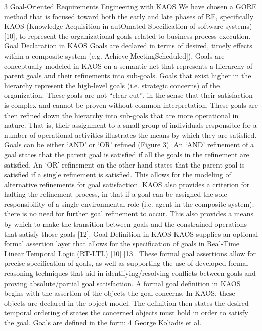 3 Goal-Oriented Requirements Engineering with KAOS
We have chosen a GORE method that is focused toward both the early and late
phases of RE, specifically KAOS (Knowledge Acquisition in autOmated Specification of software systems) [10], to represent the organizational goals related to
business process execution.
Goal Declaration in KAOS Goals are declared in terms of desired, timely
effects within a composite system (e.g. Achieve[MeetingScheduled]). Goals are
conceptually modeled in KAOS on a semantic net that represents a hierarchy
of parent goals and their refinements into sub-goals. Goals that exist higher
in the hierarchy represent the high-level goals (i.e. strategic concerns) of the
organization. These goals are not “clear cut”, in the sense that their satisfaction
is complex and cannot be proven without common interpretation. These goals
are then refined down the hierarchy into sub-goals that are more operational
in nature. That is, their assignment to a small group of individuals responsible
for a number of operational activities illustrates the means by which they are
satisfied.
Goals can be either ‘AND’ or ‘OR’ refined (Figure 3). An ‘AND’ refinement
of a goal states that the parent goal is satisfied if all the goals in the refinement
are satisfied. An ‘OR’ refinement on the other hand states that the parent goal
is satisfied if a single refinement is satisfied. This allows for the modeling of alternative refinements for goal satisfaction. KAOS also provides a criterion for
halting the refinement process, in that if a goal can be assigned the sole responsibility of a single environmental role (i.e. agent in the composite system); there
is no need for further goal refinement to occur. This also provides a means by
which to make the transition between goals and the constrained operations that
satisfy those goals [12].
Goal Definition in KAOS KAOS supplies an optional formal assertion layer
that allows for the specification of goals in Real-Time Linear Temporal Logic
(RT-LTL) [10] [13]. These formal goal assertions allow for precise specification of
goals, as well as supporting the use of developed formal reasoning techniques that
aid in identifying/resolving conflicts between goals and proving absolute/partial
goal satisfaction.
A formal goal definition in KAOS begins with the assertion of the objects
the goal concerns. In KAOS, these objects are declared in the object model.
The definition then states the desired temporal ordering of states the concerned
objects must hold in order to satisfy the goal.
Goals are defined in the form:
4 George Koliadis et al.
